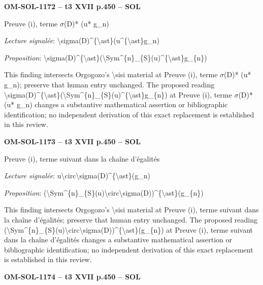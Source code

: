 \par\noindent\textbf{OM-SOL-1172 -- t3 XVII p.450 -- SOL}\par
Preuve (i), terme \ensuremath{\sigma}(D)* (u* g\_n)\par
\emph{Lecture signalée}: \textbackslash{}sigma(D)\textasciicircum{}\{\textbackslash{}ast\}(u\textasciicircum{}\{\textbackslash{}ast\}g\_n)\par
\emph{Proposition}: \textbackslash{}sigma(D)\textasciicircum{}\{\textbackslash{}ast\}(\textbackslash{}Sym\textasciicircum{}\{n\}\_\{S\}(u)\textasciicircum{}\{\textbackslash{}ast\}g\_\{n\})\par
This finding intersects Orgogozo's \textbackslash{}sisi material at Preuve (i), terme \ensuremath{\sigma}(D)* (u* g\_n); preserve that human entry unchanged. The proposed reading \textbackslash{}sigma(D)\textasciicircum{}\{\textbackslash{}ast\}(\textbackslash{}Sym\textasciicircum{}\{n\}\_\{S\}(u)\textasciicircum{}\{\textbackslash{}ast\}g\_\{n\}) at Preuve (i), terme \ensuremath{\sigma}(D)* (u* g\_n) changes a substantive mathematical assertion or bibliographic identification; no independent derivation of this exact replacement is established in this review.\par
\par\noindent\textbf{OM-SOL-1173 -- t3 XVII p.450 -- SOL}\par
Preuve (i), terme suivant dans la chaîne d'égalités\par
\emph{Lecture signalée}: u\textbackslash{}circ\textbackslash{}sigma(D)\textasciicircum{}\{\textbackslash{}ast\}(g\_n)\par
\emph{Proposition}: (\textbackslash{}Sym\textasciicircum{}\{n\}\_\{S\}(u)\textbackslash{}circ\textbackslash{}sigma(D))\textasciicircum{}\{\textbackslash{}ast\}(g\_\{n\})\par
This finding intersects Orgogozo's \textbackslash{}sisi material at Preuve (i), terme suivant dans la chaîne d'égalités; preserve that human entry unchanged. The proposed reading (\textbackslash{}Sym\textasciicircum{}\{n\}\_\{S\}(u)\textbackslash{}circ\textbackslash{}sigma(D))\textasciicircum{}\{\textbackslash{}ast\}(g\_\{n\}) at Preuve (i), terme suivant dans la chaîne d'égalités changes a substantive mathematical assertion or bibliographic identification; no independent derivation of this exact replacement is established in this review.\par
\par\noindent\textbf{OM-SOL-1174 -- t3 XVII p.450 -- SOL}\par
